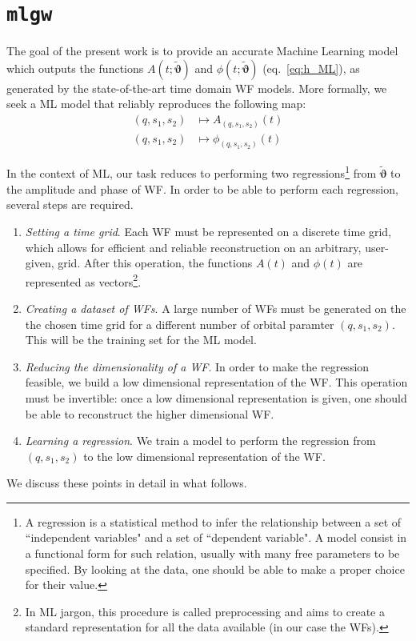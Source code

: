 \section{\texttt{mlgw}}
\label{sec:model}
%
The goal of the present work is to provide an accurate Machine Learning model which outputs the functions $A(t;\boldsymbol{\tilde{\vartheta}})$ and $\phi(t;\boldsymbol{\tilde{\vartheta}})$ (eq.~\eqref{eq:h_ML}), as generated by the state-of-the-art time domain WF models.
More formally, we seek a ML model that reliably reproduces the following map:
\begin{align}
	(q, s_1, s_2) &\longmapsto A_{(q, s_1, s_2)}(t) \label{eq:objective_amp}\\
	(q, s_1, s_2) &\longmapsto \phi_{(q, s_1, s_2)}(t) \label{eq:objective_ph}
\end{align}

\par
In the context of ML, our task reduces to performing two regressions\footnote{A regression is a statistical method to infer the relationship between a set of ``independent variables" and a set of ``dependent variable". A model consist in a functional form for such relation, usually with many free parameters to be specified. By looking at the data, one should be able to make a proper choice for their value.} 
from $\tilde{\boldsymbol{\vartheta}}$ to the amplitude and phase of WF. 
In order to be able to perform each regression, several steps are required.

\begin{enumerate}[label=(\Alph*)]
	\item \textit{Setting a time grid}. Each WF must be represented on a discrete time grid, which allows for efficient and reliable reconstruction on an arbitrary, user-given, grid. After this operation, the functions $A(t)$ and $\phi(t)$ are represented as vectors\footnote{
In ML jargon, this procedure is called preprocessing and aims to create a standard representation for all the data available (in our case the WFs).
}.
	\item \textit{Creating a dataset of WFs}. A large number of WFs must be generated on the the chosen time grid for a different number of orbital paramter $(q,s_1,s_2)$. This will be the training set for the ML model.
	\item \textit{Reducing the dimensionality of a WF}. In order to make the regression feasible, we build a low dimensional representation of the WF. This operation must be invertible: once a low dimensional representation is given, one should be able to reconstruct the higher dimensional WF.
	\item \textit{Learning a regression}. We train a model to perform the regression from $(q, s_1, s_2)$ to the low dimensional representation of the WF.
\end{enumerate}
We discuss these points in detail in what follows.

